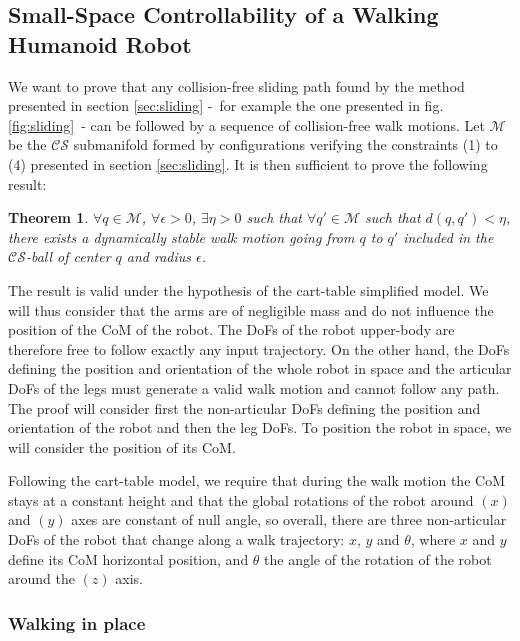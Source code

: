 \documentclass{article}
\newtheorem{theorem}{Theorem}
\begin{document}
\subsection{Small-Space Controllability of a Walking Humanoid Robot}

We want to prove that any collision-free sliding path found by  the 
method presented
in section \ref{sec:sliding}
-~for example the one presented in 
fig. \ref{fig:sliding}~- 
can be followed by a sequence of collision-free 
walk motions. 
Let $\mathcal{M}$ be the $\mathcal{CS}$ 
submanifold formed by configurations verifying the constraints (1) to 
(4) presented in section \ref{sec:sliding}. It is then sufficient to
prove the following result:
\begin{theorem}
$\forall q \in \mathcal{M}$, $\forall \epsilon >0$,
$\exists \eta >0$ such that $\forall q' \in \mathcal{M}$ such
that $d(q,q') < \eta$, there exists a dynamically stable walk motion
going from $q$ to $q'$
included in the $\mathcal{CS}$-ball of center $q$ and radius $\epsilon$. 
\end{theorem}


The result is valid under
the hypothesis of the cart-table simplified model. We will thus 
consider that the arms are of negligible mass and do not influence the 
position of the CoM of the robot. The DoFs of the robot upper-body
are therefore free to follow exactly any input trajectory. On the other 
hand, the DoFs defining the position and orientation of the whole robot in 
space and the articular DoFs of the legs must generate a valid walk motion
and cannot follow any path. The proof will consider first the non-articular 
DoFs defining the position and orientation of the robot and then the
leg DoFs.  To position the robot in space, we will consider the
position of its CoM. 


Following the cart-table model, we require that
during the walk motion the CoM stays at a constant height and that the
global rotations of the robot around $(x)$ and $(y)$ axes are constant of
null angle, so overall, there are three non-articular DoFs of the
robot that change along a walk trajectory: $x$, $y$ and $\theta$,
where $x$ and $y$ define its CoM horizontal position, and $\theta$ the
angle of the rotation of the robot around the $(z)$ axis. 


\subsubsection{Walking in place}
\label{sec:com-stc} 
\end{document}
